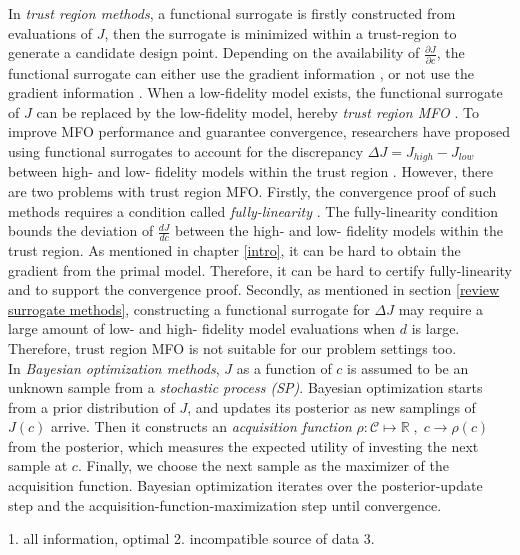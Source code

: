 \documentclass[a4paper,onecolumn]{article}
\theoremstyle{remark}
\begin{document}
\noindent In \emph{trust region methods}, a functional surrogate is firstly constructed from
evaluations of $J$, then the surrogate is minimized within a trust-region to generate
a candidate design point. Depending on the availability of $\frac{\partial J}{\partial c}$,
the functional surrogate can either use the gradient information \cite{inexactgradient1},
or not use the gradient information \cite{jones1998, trustregionconn, trustregionwild}.
When a low-fidelity model exists,
the functional surrogate of $J$ can be replaced by the low-fidelity model, hereby
\emph{trust region MFO} \cite{simplified physics, coarse discretization}.
To improve MFO performance and guarantee convergence,
researchers have proposed using functional surrogates to account for 
the discrepancy $\Delta J = J_{high} - J_{low}$
between high- and low- fidelity models within the trust region
\cite{andrewras, andrew thesis}. However, there are two problems with trust region MFO.
Firstly, the convergence proof of such methods requires
a condition called \emph{fully-linearity} \cite{trustregionconn}. The fully-linearity
condition bounds the deviation of $\frac{dJ}{dc}$ between the high- and low-
fidelity models within the trust region. As mentioned in
chapter \ref{intro}, it can be hard to obtain the gradient from the primal model.
Therefore, it can be hard to certify fully-linearity and to support 
the convergence proof.
Secondly, as mentioned in section \ref{review surrogate methods}, constructing
a functional surrogate for $\Delta J$ may require a large amount
of low- and high- fidelity model evaluations when $d$ is large.
Therefore, trust region MFO is not suitable for our problem settings too.\\

\noindent In \emph{Bayesian optimization methods}, $J$ as a function of $c$
is assumed to be an unknown sample from a \emph{stochastic process (SP)}. 
Bayesian optimization starts from a prior distribution of $J$, and
updates its posterior as new samplings of $J(c)$ arrive.
Then it constructs an \emph{acquisition function} $\rho: \mathcal{C}\mapsto \mathbb{R}\;
,\; c\rightarrow \rho(c)$ from the posterior, which measures
the expected utility of investing the next sample at $c$.
Finally, we choose the next sample as the maximizer of the acquisition function.
Bayesian optimization iterates over the posterior-update step and the 
acquisition-function-maximization step until convergence.

1. all information, optimal
2. incompatible source of data
3. 
\end{document}
